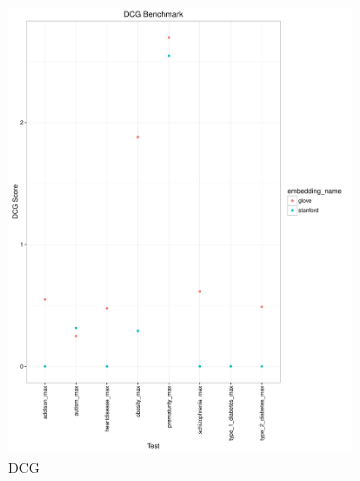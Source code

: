 \documentclass{ws-procs11x85}
\begin{document}
\begin{figure}
    \centering
    \begin{subfigure}[b]{0.5\textwidth}
        \includegraphics[width=\textwidth]{dcg_plot.pdf}
        \caption{DCG}
    \end{subfigure}
    ~ 
    \begin{subfigure}[b]{0.5\textwidth}

\end{subfigure}
\end{figure}
\end{document}
